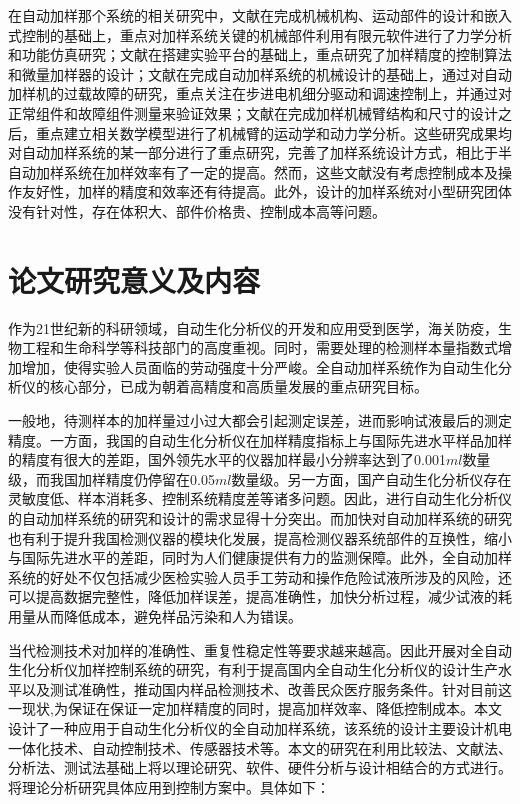在自动加样那个系统的相关研究中，文献\parencite{bib2}在完成机械机构、运动部件的设计和嵌入式控制的基础上，重点对加样系统关键的机械部件利用有限元软件进行了力学分析和功能仿真研究；文献\parencite{bib3}在搭建实验平台的基础上，重点研究了加样精度的控制算法和微量加样器的设计；文献\parencite{bib8}在完成自动加样系统的机械设计的基础上，通过对自动加样机的过载故障的研究，重点关注在步进电机细分驱动和调速控制上，并通过对正常组件和故障组件测量来验证效果；文献\parencite{bib9}在完成加样机械臂结构和尺寸的设计之后，重点建立相关数学模型进行了机械臂的运动学和动力学分析。这些研究成果均对自动加样系统的某一部分进行了重点研究，完善了加样系统设计方式，相比于半自动加样系统在加样效率有了一定的提高。然而，这些文献没有考虑控制成本及操作友好性，加样的精度和效率还有待提高。此外，设计的加样系统对小型研究团体没有针对性，存在体积大、部件价格贵、控制成本高等问题。
\section{论文研究意义及内容}
作为21世纪新的科研领域，自动生化分析仪的开发和应用受到医学，海关防疫，生物工程和生命科学等科技部门的高度重视。同时，需要处理的检测样本量指数式增加增加，使得实验人员面临的劳动强度十分严峻。全自动加样系统作为自动生化分析仪的核心部分，已成为朝着高精度和高质量发展的重点研究目标。

一般地，待测样本的加样量过小过大都会引起测定误差，进而影响试液最后的测定精度。一方面，我国的自动生化分析仪在加样精度指标上与国际先进水平样品加样的精度有很大的差距，国外领先水平的仪器加样最小分辨率达到了0.001$ml$数量级，而我国加样精度仍停留在0.05$ml$数量级。另一方面，国产自动生化分析仪存在灵敏度低、样本消耗多、控制系统精度差等诸多问题。因此，进行自动生化分析仪的自动加样系统的研究和设计的需求显得十分突出。而加快对自动加样系统的研究也有利于提升我国检测仪器的模块化发展，提高检测仪器系统部件的互换性，缩小与国际先进水平的差距，同时为人们健康提供有力的监测保障。此外，全自动加样系统的好处不仅包括减少医检实验人员手工劳动和操作危险试液所涉及的风险，还可以提高数据完整性，降低加样误差，提高准确性，加快分析过程，减少试液的耗用量从而降低成本，避免样品污染和人为错误。

当代检测技术对加样的准确性、重复性稳定性等要求越来越高。因此开展对全自动生化分析仪加样控制系统的研究，有利于提高国内全自动生化分析仪的设计生产水平以及测试准确性，推动国内样品检测技术、改善民众医疗服务条件。针对目前这一现状,为保证在保证一定加样精度的同时，提高加样效率、降低控制成本。本文设计了一种应用于自动生化分析仪的全自动加样系统，该系统的设计主要设计机电一体化技术、自动控制技术、传感器技术等。本文的研究在利用比较法、文献法、分析法、测试法基础上将以理论研究、软件、硬件分析与设计相结合的方式进行。将理论分析研究具体应用到控制方案中。具体如下：

